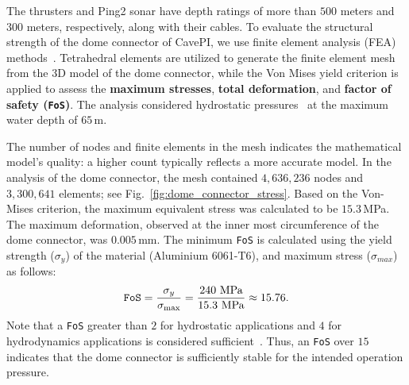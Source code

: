  
 

The thrusters and Ping2 sonar have depth ratings of more than $500$ meters and $300$ meters, respectively, along with their cables. To evaluate the structural strength of the dome connector of CavePI, we use finite element analysis (FEA) methods~\cite{bieze2018finite}. Tetrahedral elements are utilized to generate the finite element mesh from the 3D model of the dome connector, while the Von Mises yield criterion is applied to assess the \textbf{maximum stresses}, \textbf{total deformation}, and \textbf{factor of safety ({\tt FoS})}. The analysis considered hydrostatic pressures~\cite{macias2024numerical,li2023soft} at the maximum water depth of $65$\,m.


The number of nodes and finite elements in the mesh indicates the mathematical model's quality: a higher count typically reflects a more accurate model. In the analysis of the dome connector, the mesh contained $4,636,236$ nodes and $3,300,641$ elements; see Fig.~\ref{fig:dome_connector_stress}. Based on the Von-Mises criterion, the maximum equivalent stress was calculated to be $15.3$\,MPa. The maximum deformation, observed at the inner most circumference of the dome connector, was $0.005$\,mm. The minimum {\tt FoS} is calculated using the yield strength ($\sigma_y$) of the material (Aluminium 6061-T6), and maximum stress ($\sigma_{max}$) as follows: 
\begin{equation*}
    \text{{\tt FoS}} = \frac{\sigma_y}{\sigma_{\text{max}}} = \frac{240 \text{ MPa}}{15.3 \text{ MPa}} \approx 15.76.
\end{equation*}
Note that a {\tt FoS} greater than $2$ for hydrostatic applications and $4$ for hydrodynamics applications is considered sufficient~\cite{kazemi2004reliability,SafetyCulture}. Thus, an {\tt FoS} over $15$ indicates that the dome connector is sufficiently stable for the intended operation pressure.



